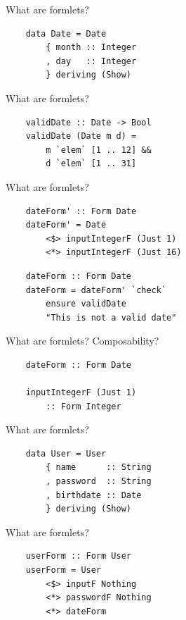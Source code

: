 \documentclass[20pt]{beamer}
\newcommand{\vspaced}{
    \vspace{5mm}
}
\begin{document}
\begin{frame}[fragile]{What are formlets?}
    \begin{lstlisting}
    data Date = Date
        { month :: Integer
        , day   :: Integer
        } deriving (Show)
    \end{lstlisting}
\end{frame}

\begin{frame}[fragile]{What are formlets?}
    \begin{lstlisting}
    validDate :: Date -> Bool
    validDate (Date m d) =
        m `elem` [1 .. 12] &&
        d `elem` [1 .. 31]
    \end{lstlisting}
\end{frame}

\begin{frame}[fragile]{What are formlets?}
    \begin{lstlisting}
    dateForm' :: Form Date
    dateForm' = Date
        <$> inputIntegerF (Just 1)
        <*> inputIntegerF (Just 16)
    \end{lstlisting}
    \begin{lstlisting}
    dateForm :: Form Date
    dateForm = dateForm' `check`
        ensure validDate
        "This is not a valid date"
    \end{lstlisting}
\end{frame}

\begin{frame}[fragile]{What are formlets?}
    Composability?
    \vspaced
    \begin{lstlisting}
    dateForm :: Form Date

    inputIntegerF (Just 1)
        :: Form Integer
    \end{lstlisting}
\end{frame}

\begin{frame}[fragile]{What are formlets?}
    \begin{lstlisting}
    data User = User
        { name      :: String
        , password  :: String
        , birthdate :: Date
        } deriving (Show)
    \end{lstlisting}
\end{frame}

\begin{frame}[fragile]{What are formlets?}
    \begin{lstlisting}
    userForm :: Form User
    userForm = User
        <$> inputF Nothing
        <*> passwordF Nothing
        <*> dateForm
    \end{lstlisting}
\end{frame}
\end{document}
